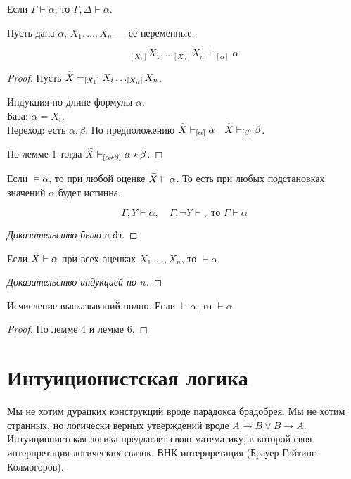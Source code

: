 \begin{lemma}
Если $\Gamma \vdash \alpha$, то $\Gamma, \Delta \vdash \alpha$.
\end{lemma}

\begin{lemma}
Пусть дана $\alpha$, $X_1,\ldots, X_n$ --- её переменные.

\[ _{[X_1]}X_1,\ldots _{[X_n]}X_n\ \vdash _{[\alpha]}\alpha  \]
\end{lemma}
\begin{proof}
    Пусть $\widetilde{X} = _{[X_1]} X_i \dots _{[X_n]} X_n$.

    Индукция по длине формулы $\alpha$.\\
    База: $\alpha = X_i$.\\
    Переход: есть $\alpha, \beta$. По предположению $\widetilde{X} \vdash _{[\alpha]} \alpha ~~~ \widetilde{X} \vdash _{[\beta]} \beta$.

    По лемме 1 тогда  $\widetilde{X} \vdash _{[\alpha \star \beta]} \alpha \star \beta$.
\end{proof}

\begin{lemma}
    Если $\vDash \alpha$, то при любой оценке $\widetilde{X} \vdash \alpha$.
    То есть при любых подстановках значений $\alpha $ будет истинна.
\end{lemma}

\begin{lemma}
    \[ \Gamma, Y \vdash \alpha, \quad \Gamma, \neg Y \vdash, \text{ то } \Gamma \vdash \alpha \]
\end{lemma}
\begin{proof}[Доказательство было в дз]
\end{proof}

\begin{lemma}
    Если $\widetilde{X} \vdash \alpha$ при всех оценках $X_1, \dots, X_n$, то $\vdash \alpha$.
\end{lemma}
\begin{proof}
    [Доказательство индукцией по $n$]
\end{proof}
\addtocounter{theorem}{-1}
\begin{theorem}
    Исчисление высказываний полно. Если $\vDash \alpha$, то $\vdash \alpha$.
\end{theorem}
\begin{proof}
    По лемме 4 и лемме 6.
\end{proof}

\section{Интуиционистская логика}
Мы не хотим дурацких конструкций вроде парадокса брадобрея.
Мы не хотим странных, но логически верных утверждений вроде $A\to B \lor B \to A$.
Интуиционистская логика предлагает свою математику, в которой своя интерпретация логических связок.
ВНК-интерпретация (Брауер-Гейтинг-Колмогоров).

